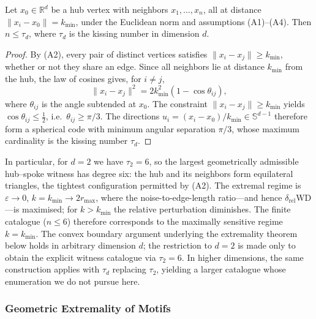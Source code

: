 \documentclass[
  11pt,
  letterpaper]{siamart251216}
\begin{document}
\begin{theorem}\label{thm:packing-bound}
Let $x_0 \in \mathbb{R}^d$ be a hub vertex with neighbors $x_1,\dots,x_n$, all at distance $\|x_i-x_0\|=k_{\min}$, under the Euclidean norm and assumptions (A1)--(A4).
Then $n \le \tau_d$, where $\tau_d$ is the kissing number in dimension $d$.
\end{theorem}

\begin{proof}
By (A2), every pair of distinct vertices satisfies $\|x_i-x_j\|\ge k_{\min}$, whether or not they share an edge.
Since all neighbors lie at distance $k_{\min}$ from the hub, the law of cosines gives, for $i\neq j$,
\[
  \|x_i-x_j\|^2 = 2k_{\min}^2(1-\cos\theta_{ij}),
\]
where $\theta_{ij}$ is the angle subtended at $x_0$.
The constraint $\|x_i-x_j\|\ge k_{\min}$ yields $\cos\theta_{ij}\le\tfrac{1}{2}$, i.e.\ $\theta_{ij}\ge\pi/3$.
The directions $u_i=(x_i-x_0)/k_{\min}\in\mathbb{S}^{d-1}$ therefore form a spherical code with minimum angular separation $\pi/3$, whose maximum cardinality is the kissing number $\tau_d$.
\end{proof}

In particular, for \(d=2\) we have \(\tau_2 = 6\), so the largest
geometrically admissible hub--spoke witness has degree six: the hub and
its neighbors form equilateral triangles, the tightest configuration
permitted by (A2). The extremal regime is \(\varepsilon\to 0\),
\(k=k_{\min}\to 2r_{\max}\), where the noise-to-edge-length ratio---and
hence \(\delta_{\mathrm{rel}}\mathrm{WD}\)---is maximised; for
\(k>k_{\min}\) the relative perturbation diminishes. The finite
catalogue (\(n \le 6\)) therefore corresponds to the maximally sensitive
regime \(k = k_{\min}\). The convex boundary argument underlying the
extremality theorem below holds in arbitrary dimension \(d\); the
restriction to \(d=2\) is made only to obtain the explicit witness
catalogue via \(\tau_2=6\). In higher dimensions, the same construction
applies with \(\tau_d\) replacing \(\tau_2\), yielding a larger
catalogue whose enumeration we do not pursue here.

\subsubsection{Geometric Extremality of
Motifs}\label{geometric-extremality-of-motifs}
\end{document}
